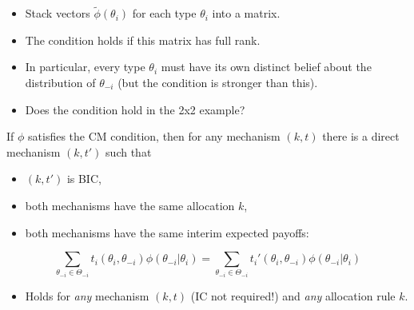 \documentclass[english,handout,10pt]{beamer}		%
\def\lyxframeend{} %
\begin{document}
\begin{itemize}
	\item Stack vectors $\tilde\phi(\theta_i)$ for each type $\theta_i$ into a matrix.
	\item The condition holds if this matrix has full rank.
	\item In particular, every type $\theta_i$ must have its own distinct belief about the distribution of $\theta_{-i}$ (but the condition is stronger than this).
	\item Does the condition hold in the 2x2 example?
\end{itemize}
\lyxframeend


\begin{theorem}
	If $\phi$ satisfies the CM condition, then for any mechanism $(k,t)$ there is a direct mechanism $(k,t')$ such that
	\begin{itemize}
		\item $(k,t')$ is BIC,
		\item both mechanisms have the same allocation $k$,
		\item both mechanisms have the same interim expected payoffs:
	\end{itemize}
	\begin{equation*}
	\sum_{\theta _{-i}\in\Theta _{-i}}t_i(\theta _i,\theta _{-i})\phi(\theta _{-i}|\theta _i)=  \sum_{\theta _{-i}\in\Theta _{-i}}t_i'(\theta _i,\theta _{-i})\phi(\theta _{-i}|\theta _i)
	\end{equation*}
\end{theorem}
\begin{itemize}
	\item Holds for \emph{any} mechanism $(k,t)$ (IC not required!) and \emph{any} allocation rule $k$.
\end{itemize}
\lyxframeend
\end{document}
